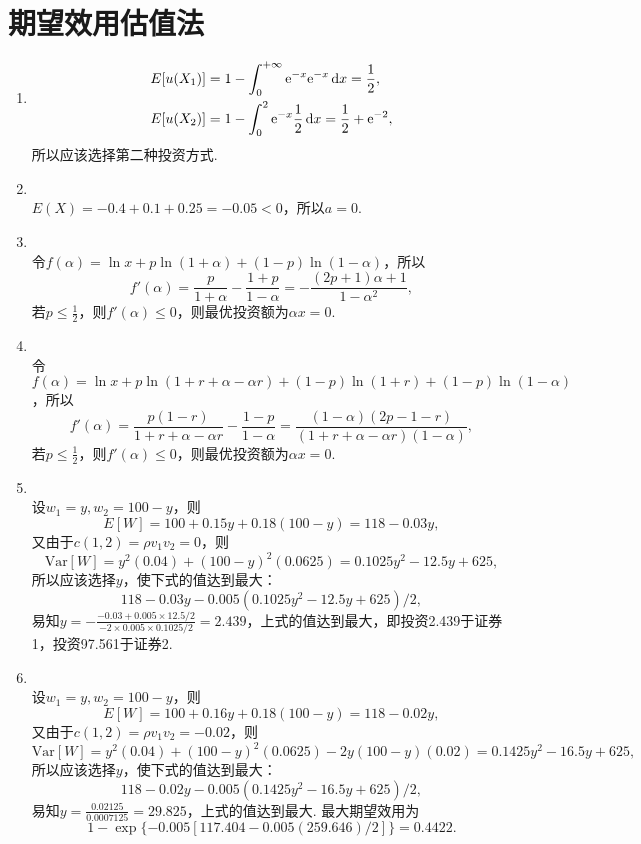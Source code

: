 \section{期望效用估值法}
\begin{enumerate}[label=\arabic{section}.\arabic*]
    \item \sol
    \begin{align*}
        E[u(X_1)]&=1-\int_{0}^{+\infty} \mathrm{e}^{-x}\mathrm{e}^{-x}\,\mathrm{d} x=\frac{1}{2},\\
        E[u(X_2)]&=1-\int_0^2 \mathrm{e}^{-x}\frac{1}{2}\,\mathrm{d} x=\frac{1}{2}+\mathrm{e}^{-2},
    \end{align*}
    所以应该选择第二种投资方式.
    \item \sol\\ $E(X)=-0.4+0.1+0.25=-0.05<0$，所以$a=0$.
    \item \pro\\ 令$f(\alpha)=\ln x+p\ln(1+\alpha)+(1-p)\ln(1-\alpha)$，所以
    \[f'(\alpha)=\frac{p}{1+\alpha}-\frac{1+p}{1-\alpha}=-\frac{(2p+1)\alpha+1}{1-\alpha^2},\]
    若$\displaystyle p \leq \frac{1}{2}$，则$f'(\alpha) \leq 0$，则最优投资额为$\alpha x=0$.
    \item \pro\\ 令$f(\alpha)=\ln x+p\ln(1+r+\alpha-\alpha r)+(1-p)\ln(1+r)+(1-p)\ln(1-\alpha)$，所以
    \[f'(\alpha)=\frac{p(1-r)}{1+r+\alpha-\alpha r}-\frac{1-p}{1-\alpha}=\frac{(1-\alpha)(2p-1-r)}{(1+r+\alpha-\alpha r)(1-\alpha)},\]
    若$\displaystyle p \leq \frac{1}{2}$，则$f'(\alpha) \leq 0$，则最优投资额为$\alpha x=0$.
    \item \sol {\kaishu \textcolor{blue}{注意：这里翻译有误，是例9.3b.}}\\
    设$w_1=y,w_2=100-y$，则\[E[W]=100+0.15y+0.18(100-y)=118-0.03y,\]
    又由于$c(1,2)=\rho v_1v_2=0$，则\[\mathrm{Var}[W]=y^2(0.04)+(100-y)^2(0.0625)=0.1025y^2-12.5y+625,\]
    所以应该选择$y$，使下式的值达到最大：
    \[118-0.03y-0.005(0.1025y^2-12.5y+625)/2,\]
    易知$\displaystyle y=-\frac{-0.03+0.005\times12.5/2}{-2\times0.005\times0.1025/2}=2.439$，上式的值达到最大，即投资2.439于证券1，投资97.561于证券2.
    \item \sol\\
    设$w_1=y,w_2=100-y$，则\[E[W]=100+0.16y+0.18(100-y)=118-0.02y,\]
    又由于$c(1,2)=\rho v_1v_2=-0.02$，则\[\mathrm{Var}[W]=y^2(0.04)+(100-y)^2(0.0625)-2y(100-y)(0.02)=0.1425y^2-16.5y+625,\]
    所以应该选择$y$，使下式的值达到最大：
    \[118-0.02y-0.005(0.1425y^2-16.5y+625)/2,\]
    易知$\displaystyle y=\frac{0.02125}{0.0007125}=29.825$，上式的值达到最大. 最大期望效用为\[1-\exp\{-0.005[117.404-0.005(259.646)/2]\}=0.4422.\]

\end{enumerate}
